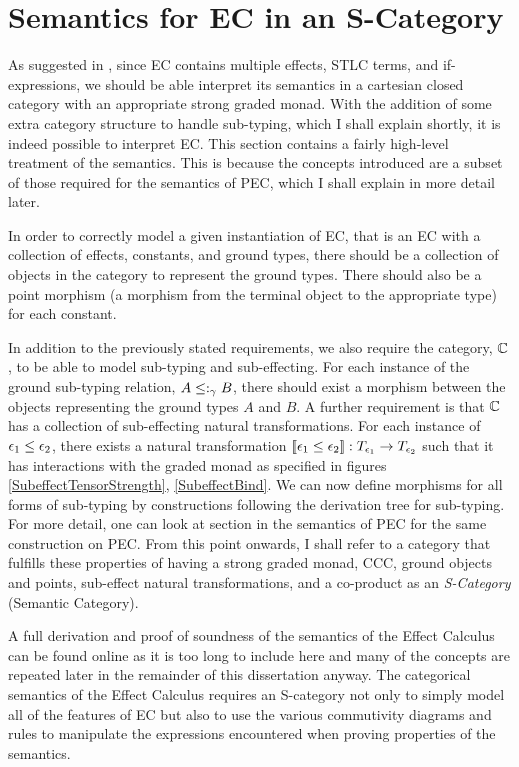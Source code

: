 \documentclass{Report}
\begin{document}
\chapter{Semantics for EC in an S-Category}\label{SCategoryIntro}

As suggested in , since EC contains multiple effects, STLC terms, and if-expressions, we should be able interpret its semantics in a cartesian closed category with an appropriate strong graded monad. With the addition of some extra category structure to handle sub-typing, which I shall explain shortly, it is indeed possible to interpret EC. This section contains a fairly high-level treatment of the semantics. This is because the concepts introduced are a subset of those required for the semantics of PEC, which I shall explain in more detail later.


In order to correctly model a given instantiation of EC, that is an EC with a collection of effects, constants, and ground types, there should be a collection of objects in the category to represent the ground types. There should also be a point morphism (a morphism from the terminal object to the appropriate type) for each constant.

In addition to the previously stated requirements, we also require the category, $\mathbb{C}$, to be able to model sub-typing and sub-effecting. For each instance of the ground sub-typing relation, $A \leq:_\gamma B$, there should exist a morphism between the objects representing the ground types $A$ and $B$. A further requirement is that $\mathbb{C}$ has a collection of sub-effecting natural transformations. For each instance of $\epsilon_1 \leq \epsilon_2$, there exists a natural transformation ${\bf [\![}\epsilon_1\leq\epsilon_2{\bf ]\!]}: T_{\epsilon_1}{}\rightarrow T_{\epsilon_2}{}$ such that it has interactions with the graded monad as specified in figures \ref{SubeffectTensorStrength}, \ref{SubeffectBind}. We can now define morphisms for all forms of sub-typing by constructions following the derivation tree for sub-typing. For more detail, one can look at section  in the semantics of PEC for the same construction on PEC. From this point onwards, I shall refer to a category that fulfills these properties of having a strong graded monad, CCC, ground objects and points, sub-effect natural transformations, and a co-product as an \textit{S-Category} (Semantic Category).

A full derivation and proof of soundness of the semantics of the Effect Calculus can be found online  as it is too long to include here and many of the concepts are repeated later in the remainder of this dissertation anyway. The categorical semantics of the Effect Calculus requires an S-category not only to simply model all of the features of EC but also to use the various commutivity diagrams and rules to manipulate the expressions encountered when proving properties of the semantics.
\end{document}
